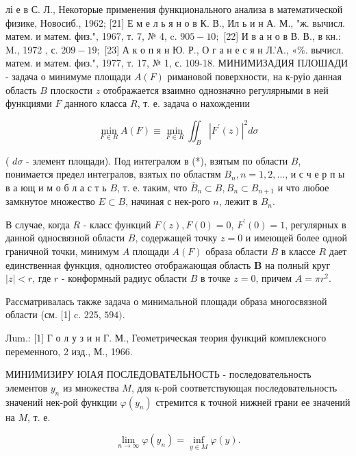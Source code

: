 \documentclass[10pt]{article}
\begin{document}
лі е в С. Л., Некоторые применения функционального анализа в математической физике, Новосиб., 1962; [21] Е м е л ь я н о в К. В., Ил ь и н А. М., "ж. вычисл. матем. и матем. физ.", 1967, т. 7, № 4, c. $905-10 ;$ [22] И в а н о в В. В., в кн.: M., 1972 , с. $209-19 ;$ [23] А к о п я н Ю. Р., О г а н е с я н Л.'А., «\%. вычисл. матем. и матем. физ.", 1977, т. 17, № 1, с. 109-18. МИНИМИЗАДИЯ ПЛОШАДИ - задача о минимуме площади $A(F)$ римановой поверхности, на к-руіо данная область $B$ плоскости $z$ отображается взаимно однозначно регулярными в ней функциями $F$ данного класса $R$, т. е. задача о нахождении



\[

\min _{F \in R} A(F) \equiv \min _{F \in R} \iint_{B}\left|F^{\prime}(z)\right|^{2} d \sigma

\]



( $d \sigma$ - элемент площади). Под интегралом в (*), взятым по области $B$, понимается предел интегралов, взятых по областям $B_{n}, n=1,2, \ldots$, и с ч е р п ы в а ющ и м о б л а с т ь $B$, т. е. таким, что $\bar{B}_{n} \subset B, B_{n} \subset B_{n+1}$ и что любое замкнутое множество $E \subset B$, начиная с нек-рого $n$, лежит в $B_{n}$.



В случае, когда $R$ - класс функций $F(z), F(0)=0$, $F^{\prime}(0)=1$, регулярных в данной односвязной области $B$, содержащей точку $z=0$ и имеющей более одной граничной точки, минимум $A$ площади $A(F)$ образа области $B$ в классе $R$ дает единственная функция, однолистео отображающая область $\boldsymbol{B}$ на полный круг $|z|<r$, где $r$ - конформный радиус области $B$ в точке $z=0$, причем $A=\pi r^{2}$.



Рассматривалась также задача о минимальной площади образа многосвязной области (см. [1] c. 225, $594)$.



Лum.: [1] Г о л у з и н Г. М., Геометрическая теория функций комплексного переменного, 2 изд., М., 1966.



МИНИМИЗИРУ ЮІАЯ ПОСЛЕДОВАТЕЛЬНОСТЬ - последовательность элементов $y_{n}$ из множества $M$, для к-рой соответствующая последовательность значений нек-рой функции $\varphi\left(y_{n}\right)$ стремится к точной нижней грани ее значений на $M$, т. е.



\[

\lim _{n \rightarrow \infty} \varphi\left(y_{n}\right)=\inf _{y \in M} \varphi(y) .

\]
\end{document}

